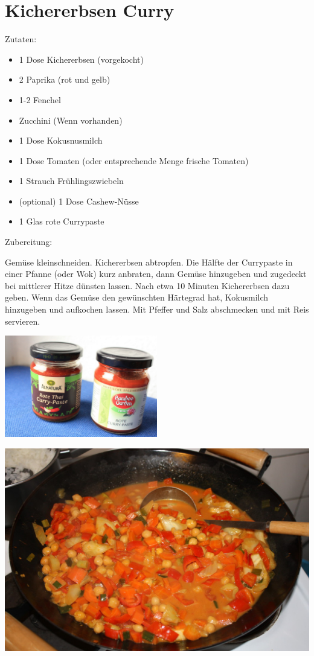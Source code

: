 \section{Kichererbsen Curry}
Zutaten:
\begin{itemize}
    \item 1 Dose Kichererbsen (vorgekocht)
    \item 2 Paprika (rot und gelb)
    \item 1-2 Fenchel
    \item Zucchini (Wenn vorhanden)
    \item 1 Dose Kokusnusmilch
    \item 1 Dose Tomaten (oder entsprechende Menge frische Tomaten)
    \item 1 Strauch Frühlingszwiebeln
    \item (optional) 1 Dose Cashew-Nüsse
    \item 1 Glas rote Currypaste
\end{itemize}

\vspace{1cm}

\noindent Zubereitung:

\noindent Gemüse kleinschneiden. Kichererbsen abtropfen. Die Hälfte der
Currypaste in einer Pfanne (oder Wok) kurz anbraten, dann Gemüse hinzugeben und
zugedeckt bei mittlerer Hitze dünsten lassen. Nach etwa 10 Minuten Kichererbsen
dazu geben. Wenn das Gemüse den gewünschten Härtegrad hat, Kokusmilch
hinzugeben und aufkochen lassen. Mit Pfeffer und Salz abschmecken und mit Reis
servieren.

\newpage
\mbox{}
\vfill
\begin{center}
    \includegraphics[width=0.5\textwidth]{Kichererbsen-Curry/IMG_6111_small.jpg}
\end{center}
\vfill
\begin{center}
    \includegraphics[width=\textwidth]{Kichererbsen-Curry/IMG_6085_small.jpg}
\end{center}
\vfill
\mbox{ }
\newpage
